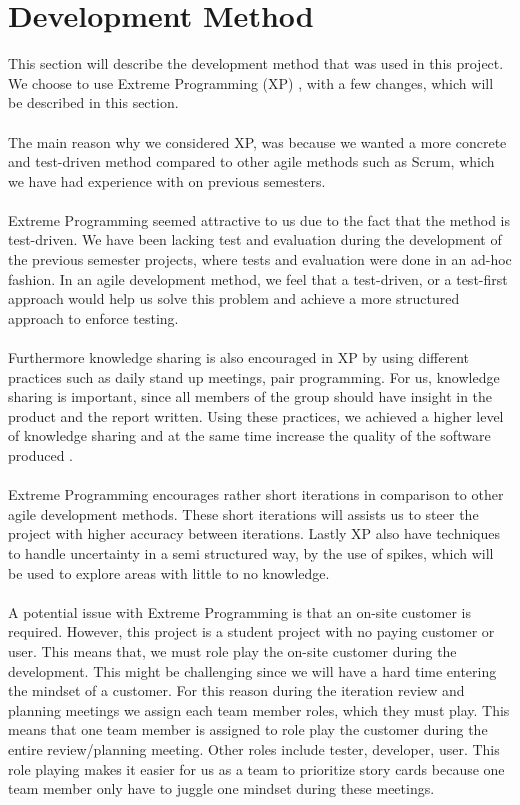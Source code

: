 
\section{Development Method}
\label{sec:development_method}

This section will describe the development method that was used in this project. We choose to use Extreme Programming (XP) \parencite{xp}, with a few changes, which will be described in this section.
\\\\
The main reason why we considered XP, was because we wanted a more concrete and test-driven method compared to other agile methods such as Scrum, which we have had experience with on previous semesters.
\\\\
Extreme Programming seemed attractive to us due to the fact that the method is test-driven. We have been lacking test and evaluation during the development of the previous semester projects, where tests and evaluation were done in an ad-hoc fashion. In an agile development method, we feel that a test-driven, or a test-first approach would help us solve this problem and achieve a more structured approach to enforce testing.
\\\\
Furthermore knowledge sharing is also encouraged in XP by using different practices such as daily stand up meetings, pair programming. For us, knowledge sharing is important, since all members of the group should have insight in the product and the report written. Using these practices, we achieved a higher level of knowledge sharing and at the same time increase the quality of the software produced .
\\\\
Extreme Programming encourages rather short iterations in comparison to other agile development methods. These short iterations will assists us to steer the project with higher accuracy between iterations. Lastly XP also have techniques to handle uncertainty in a semi structured way, by the use of spikes, which will be used to explore areas with little to no knowledge. 
\\\\
A potential issue with Extreme Programming is that an on-site customer is required. However, this project is a student project with no paying customer or user. This means that, we must role play the on-site customer during the development. This might be challenging since we will have a hard time entering the mindset of a customer. For this reason during the iteration review and planning meetings we assign each team member roles, which they must play. This means that one team member is assigned to role play the customer during the entire review/planning meeting. Other roles include tester, developer, user. This role playing makes it easier for us as a team to prioritize story cards because one team member only have to juggle one mindset during these meetings. 

